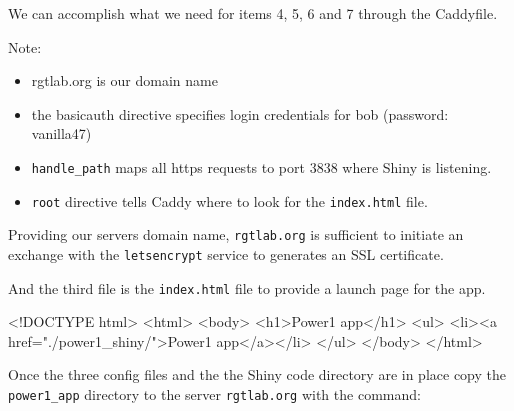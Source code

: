 \documentclass[
  letterpaper,
  DIV=11,
  numbers=noendperiod,
  oneside]{scrartcl}
\newenvironment{Shaded}{\begin{snugshade}}{\end{snugshade}}
\newcommand{\ErrorTok}[1]{\textcolor[rgb]{0.68,0.00,0.00}{#1}}
\newcommand{\NormalTok}[1]{\textcolor[rgb]{0.00,0.23,0.31}{#1}}
\newcommand{\OtherTok}[1]{\textcolor[rgb]{0.00,0.23,0.31}{#1}}
\newcommand{\SpecialCharTok}[1]{\textcolor[rgb]{0.37,0.37,0.37}{#1}}
\newcommand{\StringTok}[1]{\textcolor[rgb]{0.13,0.47,0.30}{#1}}
\providecommand{\tightlist}{%
  \setlength{\itemsep}{0pt}\setlength{\parskip}{0pt}}\usepackage{longtable,booktabs,array}
\begin{document}
We can accomplish what we need for items 4, 5, 6 and 7 through the
Caddyfile.

Note:

\begin{itemize}
\tightlist
\item
  rgtlab.org is our domain name
\item
  the basicauth directive specifies login credentials for bob (password:
  vanilla47)
\item
  \texttt{handle\_path} maps all https requests to port 3838 where Shiny
  is listening.
\item
  \texttt{root} directive tells Caddy where to look for the
  \texttt{index.html} file.
\end{itemize}

Providing our servers domain name, \texttt{rgtlab.org} is sufficient to
initiate an exchange with the \texttt{letsencrypt} service to generates
an SSL certificate.

And the third file is the \texttt{index.html} file to provide a launch
page for the app.

\begin{Shaded}
\begin{Highlighting}[]
\SpecialCharTok{\textless{}!}\NormalTok{DOCTYPE html}\SpecialCharTok{\textgreater{}}
\ErrorTok{\textless{}}\NormalTok{html}\SpecialCharTok{\textgreater{}}
  \ErrorTok{\textless{}}\NormalTok{body}\SpecialCharTok{\textgreater{}}
    \ErrorTok{\textless{}}\NormalTok{h1}\SpecialCharTok{\textgreater{}}\NormalTok{Power1 app}\SpecialCharTok{\textless{}}\ErrorTok{/}\NormalTok{h1}\SpecialCharTok{\textgreater{}}
    \ErrorTok{\textless{}}\NormalTok{ul}\SpecialCharTok{\textgreater{}}
      \ErrorTok{\textless{}}\NormalTok{li}\SpecialCharTok{\textgreater{}}\ErrorTok{\textless{}}\NormalTok{a href}\OtherTok{=}\StringTok{"./power1\_shiny/"}\SpecialCharTok{\textgreater{}}\NormalTok{Power1 app}\SpecialCharTok{\textless{}}\ErrorTok{/}\NormalTok{a}\SpecialCharTok{\textgreater{}}\ErrorTok{\textless{}/}\NormalTok{li}\SpecialCharTok{\textgreater{}}
    \ErrorTok{\textless{}/}\NormalTok{ul}\SpecialCharTok{\textgreater{}}
  \ErrorTok{\textless{}/}\NormalTok{body}\SpecialCharTok{\textgreater{}}
\ErrorTok{\textless{}/}\NormalTok{html}\SpecialCharTok{\textgreater{}} 
\end{Highlighting}
\end{Shaded}

Once the three config files and the the Shiny code directory are in
place copy the \texttt{power1\_app} directory to the server
\texttt{rgtlab.org} with the command:
\end{document}
